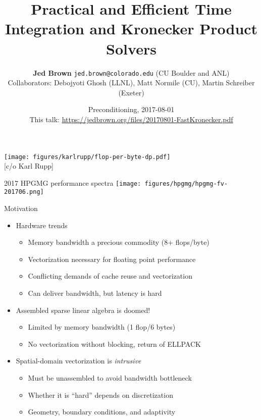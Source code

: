 \documentclass{beamer}
\title{Practical and Efficient Time Integration and Kronecker Product Solvers}
\author{{\bf Jed Brown} \texttt{jed.brown@colorado.edu} (CU Boulder and ANL) \\
  Collaborators: Debojyoti Ghosh (LLNL), Matt Normile (CU), Martin Schreiber (Exeter)}
\date{Preconditioning, 2017-08-01 \\
This talk: \url{https://jedbrown.org/files/20170801-FastKronecker.pdf}}
\begin{document}
\lstset{language=C}
\normalem

\begin{frame}
  \titlepage
\end{frame}

\begin{frame}
  \texttt{[image: figures/karlrupp/flop-per-byte-dp.pdf]} \\
  {\scriptsize [c/o Karl Rupp]}
\end{frame}

\begin{frame}{2017 HPGMG performance spectra}
  \texttt{[image: figures/hpgmg/hpgmg-fv-201706.png]} \\
\end{frame}

\begin{frame}{Motivation}
  \begin{itemize}
  \item Hardware trends
    \begin{itemize}
    \item Memory bandwidth a precious commodity (8+ flops/byte)
    \item Vectorization necessary for floating point performance
    \item Conflicting demands of cache reuse and vectorization
    \item Can deliver bandwidth, but latency is hard
    \end{itemize}
  \item Assembled sparse linear algebra is doomed!
    \begin{itemize}
    \item Limited by memory bandwidth (1 flop/6 bytes)
    \item No vectorization without blocking, return of ELLPACK
    \end{itemize}
  \item Spatial-domain vectorization is \emph{intrusive}
    \begin{itemize}
    \item Must be unassembled to avoid bandwidth bottleneck
    \item Whether it is ``hard'' depends on discretization
    \item Geometry, boundary conditions, and adaptivity
    \end{itemize}
  \end{itemize}
\end{frame}
\end{document}
